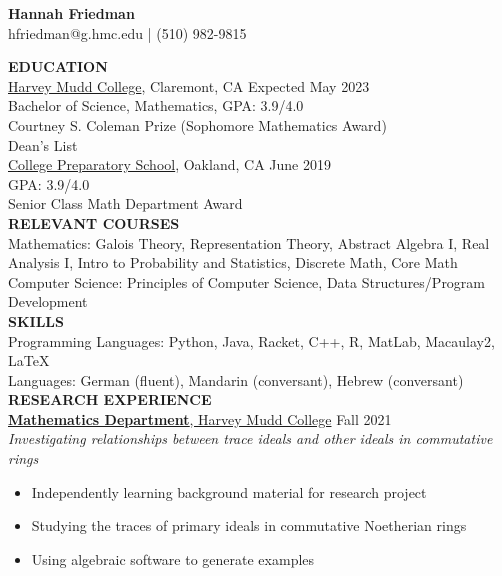\documentclass[11pt]{article}
\newcommand{\hdr}[1]{\textcolor{blue(ryb)}{\textbf{#1}}}
\newcommand{\role}[3]{\underline{\textbf{#1}, {#2}} \hfill #3}
\begin{document}
\begin{center}
\hdr{\Large{Hannah Friedman}}\\
hfriedman@g.hmc.edu | (510) 982-9815\\
\end{center}
\medskip
\raggedright
\hdr{EDUCATION}\\
\underline{Harvey Mudd College}, Claremont, CA \hfill Expected May 2023\\
Bachelor of Science, Mathematics, GPA: 3.9/4.0\\
Courtney  S. Coleman Prize (Sophomore Mathematics Award)\\
Dean's List
\medskip\\
\underline{College Preparatory School}, Oakland, CA \hfill June 2019\\
GPA: 3.9/4.0\\
Senior Class Math Department Award\\
\bigskip
\hdr{RELEVANT COURSES}\\
Mathematics: Galois Theory, Representation Theory, Abstract Algebra I, Real Analysis I, Intro to Probability and Statistics, Discrete Math, Core Math\\
Computer Science: Principles of Computer Science, Data Structures/Program Development
\bigskip\\
\hdr{SKILLS}\\
Programming Languages: Python, Java, Racket, C++, R, MatLab, Macaulay2, LaTeX\\
Languages: German (fluent), Mandarin (conversant), Hebrew (conversant)
\bigskip\\
\hdr{RESEARCH EXPERIENCE}\\
\role{Mathematics Department}{Harvey Mudd College}{Fall 2021}\\
\textit{Investigating relationships between trace ideals and other ideals in commutative rings}
\begin{itemize}
  \item Independently learning background material for research project
  \item Studying the traces of primary ideals in commutative Noetherian rings
  \item Using algebraic software to generate examples
\end{itemize}
\end{document}
